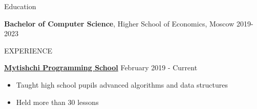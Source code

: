 
\usepackage[left=0.4 in,top=0.4in,right=0.4 in,bottom=0.4in]{geometry} %
\newcommand{\tab}[1]{\hspace{.2667\textwidth}\rlap{#1}} 
\newcommand{\itab}[1]{\hspace{0em}\rlap{#1}}

\address{+8(915) 300-46-21 \\ \href{mailto:nikulin.o244@gmail.com}{nikulin.o244@gmail.com} \\ \href{https://github.com/Oanikulin}{github.com/Oanikulin}}   %
\newcommand{\resitem}[1]{\item #1 \vspace{-2pt}}



\begin{rSection}{Education}

{\bf Bachelor of Computer Science}, Higher School of Economics, Moscow \hfill {2019-2023}

\end{rSection}


\begin{rSection}{EXPERIENCE}

\textbf{\href{https://informatics.ru/about-us/}{Mytishchi Programming School}} \hfill February 2019 - Current
 \begin{itemize}
    \itemsep -3pt {} 
     \item Taught high school pupils advanced algorithms and data structures
     \item Held more than 30 lessons
 \end{itemize}
 

\end{rSection} 

